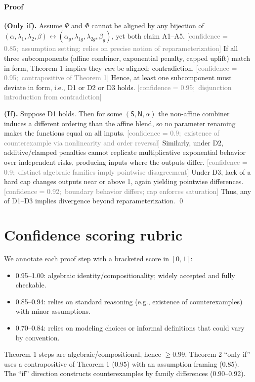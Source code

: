 \documentclass[11pt]{article}
\newcommand{\conf}[2]{\textcolor{gray}{\footnotesize [confidence = #1;\ #2]}}
\newcommand{\Ssig}{\mathsf{S}}
\newcommand{\Nsig}{\mathsf{N}}
\newcommand{\alloc}{\alpha}
\newcommand{\lA}{\lambda_1}
\newcommand{\lV}{\lambda_2}
\newcommand{\uplift}{\beta}
\newcommand{\score}{\Psi}
\newcommand{\gscore}{\Phi}
\begin{document}
\paragraph{Proof}
\textbf{(Only if).}
Assume $\score$ and $\gscore$ cannot be aligned by any bijection of $(\alloc,\lA,\lV,\uplift)\leftrightarrow(\alpha_g,\lambda_{1g},\lambda_{2g},\beta_g)$, yet both claim A1--A5.
\conf{0.85}{assumption setting; relies on precise notion of reparameterization}
If all three subcomponents (affine combiner, exponential penalty, capped uplift) match in form, Theorem 1 implies they \emph{can} be aligned; contradiction.
\conf{0.95}{contrapositive of Theorem 1}
Hence, at least one subcomponent must deviate in form, i.e., D1 or D2 or D3 holds.
\conf{0.95}{disjunction introduction from contradiction}

\smallskip
\textbf{(If).}
Suppose D1 holds. Then for some $(\Ssig,\Nsig,\alloc)$ the non-affine combiner induces a different ordering than the affine blend, so no parameter renaming makes the functions equal on all inputs.
\conf{0.9}{existence of counterexample via nonlinearity and order reversal}
Similarly, under D2, additive/clamped penalties cannot replicate multiplicative exponential behavior over independent risks, producing inputs where the outputs differ.
\conf{0.9}{distinct algebraic families imply pointwise disagreement}
Under D3, lack of a hard cap changes outputs near or above 1, again yielding pointwise differences.
\conf{0.92}{boundary behavior differs; cap enforces saturation}
Thus, any of D1--D3 implies divergence beyond reparameterization. \qed

\section*{Confidence scoring rubric}
We annotate each proof step with a bracketed score in $[0,1]$:
\begin{itemize}[leftmargin=1.4em]
  \item 0.95--1.00: algebraic identity/compositionality; widely accepted and fully checkable.
  \item 0.85--0.94: relies on standard reasoning (e.g., existence of counterexamples) with minor assumptions.
  \item 0.70--0.84: relies on modeling choices or informal definitions that could vary by convention.
\end{itemize}
Theorem 1 steps are algebraic/compositional, hence $\ge 0.99$. Theorem 2 ``only if'' uses a contrapositive of Theorem 1 ($0.95$) with an assumption framing (0.85). The ``if'' direction constructs counterexamples by family differences (0.90--0.92).
\end{document}
